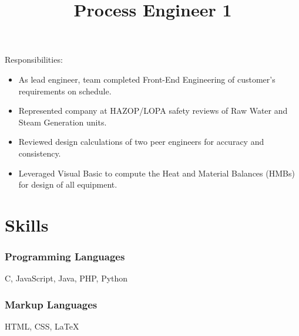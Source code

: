 \documentclass[12pt]{res} %
\begin{document}
\begin{resume}
            \title{\bfseries Process Engineer 1}
            \begin{position}
                Responsibilities:
                \begin{itemize}
                    \setlength{\itemindent}{-0.50in}
                    \itemsep0em 
                    \item As lead engineer, team completed Front-End Engineering of customer's requirements on schedule.	
                    \item Represented company at HAZOP/LOPA safety reviews of Raw Water and Steam Generation units.									
                    \item Reviewed design calculations of two peer engineers for accuracy and consistency.									
                    \item Leveraged Visual Basic to compute the Heat and Material Balances (HMBs) for design of all equipment.				
                \end{itemize}
            \end{position}
            \vspace{-12pt}

            \section{Skills}
            \vspace{-4pt}

            \begin{multicols}{3}


            \subsubsection{Programming Languages}
            \vspace{-22pt}
            C, JavaScript, Java, PHP, Python
            \vspace{-36pt}

            \subsubsection{Markup Languages}
            \vspace{-22pt}
            HTML, CSS, \LaTeX
            \vspace{-36pt}


\end{multicols}
\end{resume}
\end{document}
